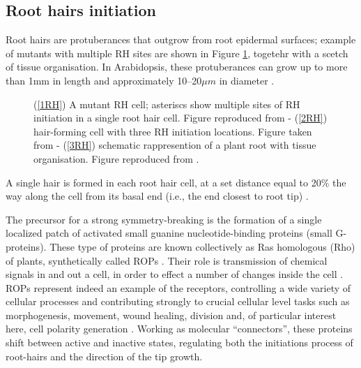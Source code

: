 \subsection{Root hairs initiation}\label{sec:RH initiation}
Root hairs are protuberances that outgrow from root epidermal surfaces; example of mutants with multiple RH sites are shown in Figure \ref{fig:RH}, togetehr with a scetch of tissue organisation. In Arabidopsis, these protuberances can grow up to more than 1mm in length and approximately 10–20$\mu m$ in diameter \cite{intra1_R:Arabook}.
\begin{figure}[H]
    \centering
    \quad
    \quad
    \caption[Root-hairs initiation]{ (\ref{1RH}) A mutant RH cell; asteriscs show multiple sites of RH initiation in a single root hair cell. Figure reproduced from \cite{phd:120} - (\ref{2RH}) hair-forming cell with three RH initiation locations. Figure taken from \cite{phd:120} - (\ref{3RH}) schematic rappresention of a plant root with tissue organisation. Figure reproduced from \cite{jones}.}
    \label{fig:RH}
\end{figure}

A single hair is formed in each root hair cell, at a set distance equal to 20$\%$ the way along the cell from its basal end (i.e., the end closest to root tip) \cite{phd:119_root}.

The precursor for a strong symmetry-breaking is the formation of a single localized patch of activated small guanine nucleotide-binding proteins (small G-proteins). These type of proteins are known collectively as Ras homologous (Rho) of plants, synthetically called ROPs \cite{phd:17_GTP, intra2}. Their role is transmission of chemical signals in and out a cell, in order to effect a number of changes inside the cell \cite{phd:67_hill}. ROPs represent indeed an example of the receptors, controlling a wide variety of cellular processes and contributing strongly to crucial cellular level tasks such as morphogenesis, movement, wound healing, division and, of particular interest here, cell polarity generation \cite{phd:102_rop}. Working as molecular “connectors”, these proteins shift between active and inactive states, regulating both the initiations process of root-hairs and the direction of the tip growth.

